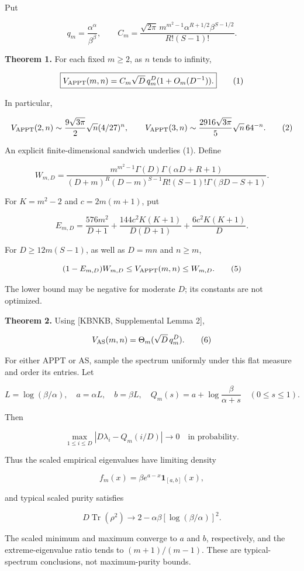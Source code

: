 \documentclass[
  11pt,
]{article}
\begin{document}
Put

\[
q_m=\frac{\alpha^\alpha}{\beta^\beta},\qquad
C_m=\frac{\sqrt{2\pi}\,m^{m^2-1}\alpha^{R+1/2}\beta^{S-1/2}}{R!(S-1)!}.
\]

\textbf{Theorem 1.} For each fixed \(m\geq2\), as \(n\) tends to
infinity,

\[
\boxed{V_{\rm APPT}(m,n)=C_m\sqrt D\,q_m^D(1+O_m(D^{-1})).}
\tag{1}
\]

In particular,

\[
V_{\rm APPT}(2,n)\sim\frac{9\sqrt{3\pi}}2\sqrt n(4/27)^n,\qquad
V_{\rm APPT}(3,n)\sim\frac{2916\sqrt{3\pi}}5\sqrt n\,64^{-n}.
\tag{2}
\]

An explicit finite-dimensional sandwich underlies (1). Define

\[
W_{m,D}=\frac{m^{m^2-1}\Gamma(D)\Gamma(\alpha D+R+1)}
{(D+m)^R(D-m)^{S-1}R!(S-1)!\Gamma(\beta D-S+1)}.
\tag{3}
\]

For \(K=m^2-2\) and \(c=2m(m+1)\), put

\[
E_{m,D}=\frac{576m^2}{D+1}
+\frac{144c^2K(K+1)}{D(D+1)}+\frac{6c^2K(K+1)}D.
\tag{4}
\]

For \(D\geq12m(S-1)\), as well as \(D=mn\) and \(n\geq m\),

\[
(1-E_{m,D})W_{m,D}\leq V_{\rm APPT}(m,n)\leq W_{m,D}.
\tag{5}
\]

The lower bound may be negative for moderate \(D\); its constants are
not optimized.

\textbf{Theorem 2.} Using {[}KBNKB, Supplemental Lemma 2{]},

\[
V_{\rm AS}(m,n)=\Theta_m(\sqrt D\,q_m^D).
\tag{6}
\]

For either APPT or AS, sample the spectrum uniformly under this flat
measure and order its entries. Let

\[
L=\log(\beta/\alpha),\quad a=\alpha L,\quad b=\beta L,\quad
Q_m(s)=a+\log\frac\beta{\alpha+s}\quad(0\leq s\leq1).
\]

Then

\[
\boxed{\max_{1\leq i\leq D}|D\lambda_i-Q_m(i/D)|\longrightarrow0
\quad\text{in probability}.}
\tag{7}
\]

Thus the scaled empirical eigenvalues have limiting density

\[
f_m(x)=\beta e^{a-x}\mathbf1_{[a,b]}(x),
\tag{8}
\]

and typical scaled purity satisfies

\[
D\operatorname{Tr}(\rho^2)\longrightarrow2-\alpha\beta[\log(\beta/\alpha)]^2.
\tag{9}
\]

The scaled minimum and maximum converge to \(a\) and \(b\),
respectively, and the extreme-eigenvalue ratio tends to \((m+1)/(m-1)\).
These are typical-spectrum conclusions, not maximum-purity bounds.
\end{document}
